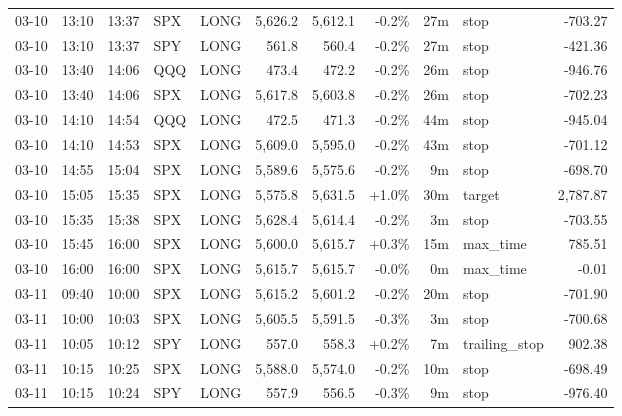 \documentclass[11pt,a4paper,twoside]{article}
\begin{document}
\begin{center}
\begin{longtable}{>{\color{txtmain}}l l l l l r r r r >{\color{txtmain}}l r}
03-10 & 13:10 & 13:37 & SPX & LONG & 5,626.2 & 5,612.1 & \textcolor{lossred}{-0.2\%} & 27m & stop & \textcolor{lossred}{-703.27} \\
03-10 & 13:10 & 13:37 & SPY & LONG & 561.8 & 560.4 & \textcolor{lossred}{-0.2\%} & 27m & stop & \textcolor{lossred}{-421.36} \\
03-10 & 13:40 & 14:06 & QQQ & LONG & 473.4 & 472.2 & \textcolor{lossred}{-0.2\%} & 26m & stop & \textcolor{lossred}{-946.76} \\
03-10 & 13:40 & 14:06 & SPX & LONG & 5,617.8 & 5,603.8 & \textcolor{lossred}{-0.2\%} & 26m & stop & \textcolor{lossred}{-702.23} \\
03-10 & 14:10 & 14:54 & QQQ & LONG & 472.5 & 471.3 & \textcolor{lossred}{-0.2\%} & 44m & stop & \textcolor{lossred}{-945.04} \\
03-10 & 14:10 & 14:53 & SPX & LONG & 5,609.0 & 5,595.0 & \textcolor{lossred}{-0.2\%} & 43m & stop & \textcolor{lossred}{-701.12} \\
03-10 & 14:55 & 15:04 & SPX & LONG & 5,589.6 & 5,575.6 & \textcolor{lossred}{-0.2\%} & 9m & stop & \textcolor{lossred}{-698.70} \\
03-10 & 15:05 & 15:35 & SPX & LONG & 5,575.8 & 5,631.5 & \textcolor{wingreen}{+1.0\%} & 30m & target & \textcolor{wingreen}{2,787.87} \\
03-10 & 15:35 & 15:38 & SPX & LONG & 5,628.4 & 5,614.4 & \textcolor{lossred}{-0.2\%} & 3m & stop & \textcolor{lossred}{-703.55} \\
03-10 & 15:45 & 16:00 & SPX & LONG & 5,600.0 & 5,615.7 & \textcolor{wingreen}{+0.3\%} & 15m & max\_time & \textcolor{wingreen}{785.51} \\
03-10 & 16:00 & 16:00 & SPX & LONG & 5,615.7 & 5,615.7 & \textcolor{lossred}{-0.0\%} & 0m & max\_time & \textcolor{lossred}{-0.01} \\
03-11 & 09:40 & 10:00 & SPX & LONG & 5,615.2 & 5,601.2 & \textcolor{lossred}{-0.2\%} & 20m & stop & \textcolor{lossred}{-701.90} \\
03-11 & 10:00 & 10:03 & SPX & LONG & 5,605.5 & 5,591.5 & \textcolor{lossred}{-0.3\%} & 3m & stop & \textcolor{lossred}{-700.68} \\
03-11 & 10:05 & 10:12 & SPY & LONG & 557.0 & 558.3 & \textcolor{wingreen}{+0.2\%} & 7m & trailing\_stop & \textcolor{wingreen}{902.38} \\
03-11 & 10:15 & 10:25 & SPX & LONG & 5,588.0 & 5,574.0 & \textcolor{lossred}{-0.2\%} & 10m & stop & \textcolor{lossred}{-698.49} \\
03-11 & 10:15 & 10:24 & SPY & LONG & 557.9 & 556.5 & \textcolor{lossred}{-0.3\%} & 9m & stop & \textcolor{lossred}{-976.40} \\

\end{longtable}
\end{center}
\end{document}
